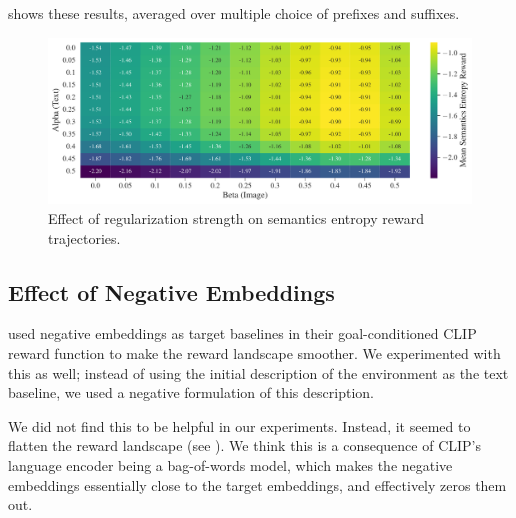  shows these results, averaged over multiple choice of prefixes and suffixes.

\begin{figure}[H]
    \centering
    \includegraphics[width=\textwidth]{images/alpha_beta_temp12avg_noneg.pdf}
    \caption{Effect of regularization strength on semantics entropy reward trajectories.}
    \label{fig:clip-alpha-beta}
\end{figure}




\subsection{Effect of Negative Embeddings}
\label{sec:negative-embeddings}
\cite{negprompt} used negative embeddings as target baselines in their goal-conditioned CLIP reward function to make the reward landscape smoother.
We experimented with this as well; instead of using the initial description of the environment as the text baseline, we used a negative formulation of this description.

We did not find this to be helpful in our experiments.
Instead, it seemed to flatten the reward landscape (see ).
We think this is a consequence of CLIP's language encoder being a bag-of-words model, which makes the negative embeddings essentially close to the target embeddings, and effectively zeros them out.

